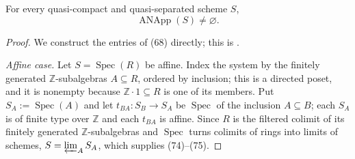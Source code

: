 \begin{lemma}
  \label{lemma:nagata-absolute-noetherian-approximation-exists}
  \leanok

  For every quasi-compact and quasi-separated scheme \(S\),
  \[
    \operatorname{ANApp}(S)\neq\varnothing.                         \tag{79}
  \]
\end{lemma}

\begin{proof}
  \leanok
  We construct the entries of (68) directly; this is
  \cite[\href{https://stacks.math.columbia.edu/tag/01ZA}{Tag 01ZA}]
    {stacks-project}.

  \emph{Affine case.}  Let $S=\operatorname{Spec}(R)$ be affine.  Index the
  system by the finitely generated $\mathbb Z$-subalgebras $A\subseteq R$,
  ordered by inclusion; this is a directed poset, and it is nonempty because
  $\mathbb Z\cdot 1\subseteq R$ is one of its members.  Put
  $S_A:=\operatorname{Spec}(A)$ and let $t_{BA}\colon S_B\to S_A$ be
  $\operatorname{Spec}$ of the inclusion $A\subseteq B$; each $S_A$ is of finite
  type over $\mathbb Z$ and each $t_{BA}$ is affine.  Since $R$ is the filtered
  colimit of its finitely generated $\mathbb Z$-subalgebras and
  $\operatorname{Spec}$ turns colimits of rings into limits of schemes,
  $S=\varprojlim_A S_A$, which supplies (74)--(75).


\end{proof}
